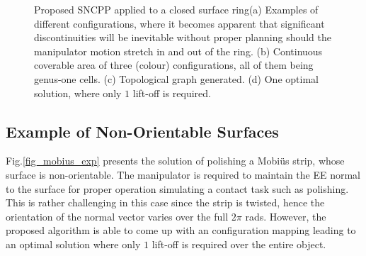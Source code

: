 \documentclass[Afour,sageh,times]{sagej}
\begin{document}
\begin{figure}[t]
\caption{Proposed SNCPP applied to a closed surface ring(a) Examples of different configurations, where it becomes apparent that significant discontinuities will be inevitable without proper planning should the manipulator motion stretch in and out of the ring.  (b) Continuous coverable area 
of three (colour) configurations, all of them being genus-one cells. (c) Topological graph generated. (d) One optimal solution, where 
only $1$ lift-off is required.}
\label{fig_ring_exp}
\end{figure}

\subsection{Example of Non-Orientable Surfaces}
Fig.\ref{fig_mobius_exp} presents the solution of polishing a Mobi\"{u}s strip, whose surface is non-orientable. The manipulator is required to maintain the EE normal to the surface for proper operation simulating a contact task such as polishing. This is rather challenging in this case 
since the strip is twisted, hence the orientation of the normal vector varies over the full $2\pi$ rads. However, the proposed algorithm 
is able to come up with an configuration mapping leading to an optimal solution where only $1$ lift-off is required over the entire object.
\end{document}
